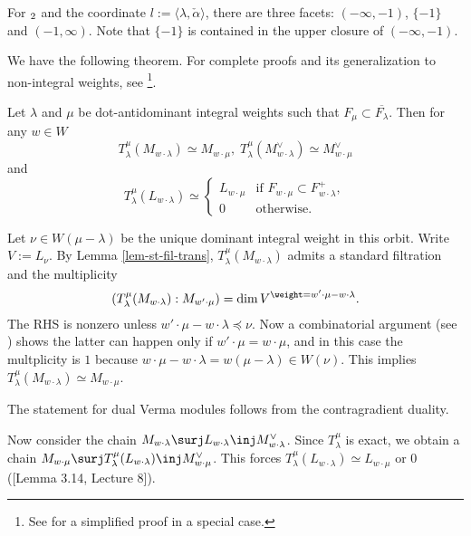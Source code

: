 	\begin{exam}
		For $\sl_2$ and the coordinate $l:=\langle \lambda,\check\alpha\rangle$, there are three facets: $(-\infty,-1)$, $\{-1\}$ and $(-1,\infty)$. Note that $\{-1\}$ is contained in the upper closure of $(-\infty,-1)$.

	\end{exam}

	We have the following theorem. For complete proofs and its generalization to non-integral weights, see \cite[Sect. 7]{H}\footnote{See \cite[Sect. 4.23]{G} for a simplified proof in a special case.}.

	\begin{thm}
		\label{thm-tranlation-st-irre}
		Let $\lambda$ and $\mu$ be dot-antidominant integral weights such that $F_\mu\subset \overline{F_\lambda}$. Then for any $w\in W$
		\[
			T_\lambda^\mu( M_{w\cdot \lambda} ) \simeq M_{w\cdot \mu},\; T_\lambda^\mu( M_{w\cdot \lambda}^\vee ) \simeq M_{w\cdot \mu}^\vee
		\]
		and
		\[	 T_\lambda^\mu( L_{w\cdot \lambda} ) \simeq
			\left\{ 
					\begin{array}{rcl}  
						L_{w\cdot \mu}	&	\textrm{if } F_{w\cdot \mu} \subset F_{w\cdot \lambda}^+ ,\\
						0	&	\textrm{otherwise}.
					\end{array}\right.
		\]
	\end{thm}

	\proof[Sketch]
		Let $\nu \in W(\mu-\lambda)$ be the unique dominant integral weight in this orbit. Write $V:=L_\nu$. By Lemma \ref{lem-st-fil-trans}, $T_\lambda^\mu( M_{w\cdot \lambda} )$ admits a standard filtration and the multiplicity 
		\[
			(T_\lambda^\mu( M_{w\cdot \lambda} ):  M_{w'\cdot \mu}) = \dim V^{\weight = w'\cdot \mu -w\cdot \lambda}.
		\]
		The RHS is nonzero unless $w'\cdot \mu -w\cdot \lambda\preceq \nu$. Now a combinatorial argument (see \cite[Lemma 7.5]{H}) shows the latter can happen only if $w'\cdot \mu = w\cdot \mu$, and in this case the multplicity is $1$ because $w\cdot \mu-w\cdot \lambda = w(\mu-\lambda) \in W(\nu)$. This implies $T_\lambda^\mu( M_{w\cdot \lambda} ) \simeq M_{w\cdot \mu}$. 

		The statement for dual Verma modules follows from the contragradient duality.

		Now consider the chain $M_{w\cdot \lambda} \surj  L_{w\cdot \lambda} \inj M_{w\cdot \lambda}^\vee$. Since $T_\lambda^\mu$ is exact, we obtain a chain $ M_{w\cdot \mu}\surj T_\lambda^\mu(L_{w\cdot \lambda}) \inj M_{w\cdot \mu}^\vee$. This forces $T_\lambda^\mu(L_{w\cdot \lambda})\simeq L_{w\cdot \mu}$ or $0$ ([Lemma 3.14, Lecture 8]). 

